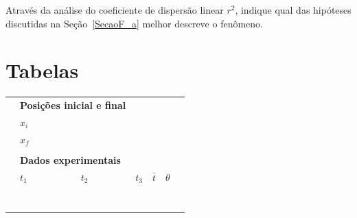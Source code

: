 \begin{question}[type={exam}]{2}
Através da análise do coeficiente de dispersão linear $r^2$, indique qual das hipóteses discutidas na Seção~\ref{SecaoF_a} melhor descreve o fenômeno.
\end{question}
\vfill

\pagebreak
\section{Tabelas}

\begin{table}[!h]
\centering
\begin{tabular}{lp{25mm}p{25mm}p{25mm}p{25mm}p{25mm}l}
\toprule
	& \multicolumn{2}{l}{\textbf{Posições inicial e final}} \\
	\cmidrule{2-3}
	& $x_i$ \cellcolor[gray]{0.89} & \cellcolor[gray]{0.92} \\
	& $x_f$ \cellcolor[gray]{0.95} & \cellcolor[gray]{0.97} \\
	\cmidrule{2-3}
\\
	& \multicolumn{6}{l}{\textbf{Dados experimentais}} \\
	\cmidrule{2-6}
	& $t_1$ & $t_2$ & $t_3$ & $\overline{t}$ & $\theta$ & \\
	\cmidrule{2-6}
	& \cellcolor[gray]{0.89} & \cellcolor[gray]{0.92} & \cellcolor[gray]{0.89} & \cellcolor[gray]{0.92} & \cellcolor[gray]{0.89} \\
	& \cellcolor[gray]{0.95} & \cellcolor[gray]{0.97} & \cellcolor[gray]{0.95} & \cellcolor[gray]{0.97} & \cellcolor[gray]{0.95} \\
	& \cellcolor[gray]{0.89} & \cellcolor[gray]{0.92} & \cellcolor[gray]{0.89} & \cellcolor[gray]{0.92} & \cellcolor[gray]{0.89} \\
	& \cellcolor[gray]{0.95} & \cellcolor[gray]{0.97} & \cellcolor[gray]{0.95} & \cellcolor[gray]{0.97} & \cellcolor[gray]{0.95} \\
	& \cellcolor[gray]{0.89} & \cellcolor[gray]{0.92} & \cellcolor[gray]{0.89} & \cellcolor[gray]{0.92} & \cellcolor[gray]{0.89} \\
	& \cellcolor[gray]{0.95} & \cellcolor[gray]{0.97} & \cellcolor[gray]{0.95} & \cellcolor[gray]{0.97} & \cellcolor[gray]{0.95} \\
	& \cellcolor[gray]{0.89} & \cellcolor[gray]{0.92} & \cellcolor[gray]{0.89} & \cellcolor[gray]{0.92} & \cellcolor[gray]{0.89} \\

\end{tabular}
\end{table}
